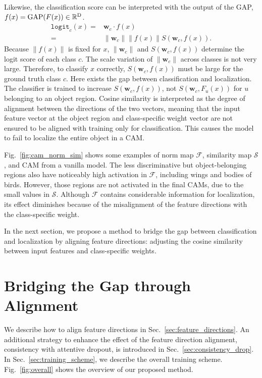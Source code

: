 Likewise, the classification score can be interpreted with the output of the GAP, $f(x)=\text{GAP}(F(x))\in\mathbb{R}^{\rm{D}}$.
\begin{equation}\label{eq:logit}
\begin{aligned}
\texttt{logit}_c(x) = & \mathbf{w}_c \cdot f(x) \\
= & \|\mathbf{w}_c\|\left\lVert f(x)\right\rVert S\left( \mathbf{w}_c,f(x)\right).
\end{aligned}
\end{equation}
Because $\left\lVert f(x)\right\rVert$ is fixed for $x$, $\|\mathbf{w}_c\|$ and $S\left( \mathbf{w}_c,f(x)\right)$ determine the logit score of each class $c$.
The scale variation of $\|\mathbf{w}_c\|$ across classes is not very large.
Therefore, to classify $x$ correctly, $S(\mathbf{w}_c, f(x))$ must be large for the ground truth class $c$.
Here exists the gap between classification and localization.
The classifier is trained to increase $S(\mathbf{w}_c, f(x))$, not $S(\mathbf{w}_c, F_u(x))$ for $u$ belonging to an object region. Cosine similarity is interpreted as the degree of alignment between the directions of the two vectors, meaning that the input feature vector at the object region and class-specific weight vector are not ensured to be aligned with training only for classification.
This causes the model to fail to localize the entire object in a CAM.

Fig.~\ref{fig:cam_norm_sim} shows some examples of norm map $\mathcal{F}$, similarity map $\mathcal{S}$, and CAM from a vanilla model.
The less discriminative but object-belonging regions also have noticeably high activation in $\mathcal{F}$, including wings and bodies of birds. 
However, those regions are not activated in the final CAMs, due to the small values in $\mathcal{S}$.
Although $\mathcal{F}$ contains considerable information for localization, its effect diminishes because of the misalignment of the feature directions with the class-specific weight.

In the next section, we propose a method to bridge the gap between classification and localization by aligning feature directions: adjusting the cosine similarity between input features and class-specific weights. 


\section{Bridging the Gap through Alignment}
We describe how to align feature directions in Sec.~\ref{sec:feature_directions}. An additional strategy to enhance the effect of the feature direction alignment, consistency with attentive dropout, is introduced in Sec.~\ref{sec:consistency_drop}. In Sec.~\ref{sec:training_scheme}, we describe the overall training scheme.
Fig.~\ref{fig:overall} shows the overview of our proposed method.


